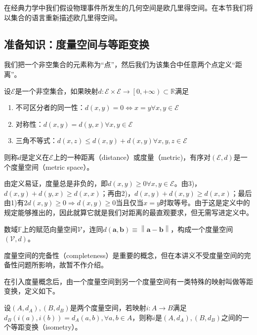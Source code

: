 \documentclass[main.tex]{subfiles}
\begin{document}
在经典力学中我们假设物理事件所发生的几何空间是欧几里得空间。在本节我们将以集合的语言重新描述欧几里得空间。

\subsection{准备知识：度量空间与等距变换}

我们把一个非空集合的元素称为“点”，然后我们为该集合中任意两个点定义“距离”。

\begin{definition}[度量空间]
设$\mathcal{E}$是一个非空集合，如果映射$d:\mathcal{E}\times\mathcal{E}\rightarrow\left[0,+\infty\right)\subset\mathbb{R}$满足
\begin{enumerate}
    \item 不可区分者的同一性：$d\left(x,y\right)=0\Leftrightarrow x=y\forall x,y\in\mathcal{E}$
    \item 对称性：$d\left(x,y\right)=d\left(y,x\right)\forall x,y\in\mathcal{E}$
    \item 三角不等式：$d\left(x,z\right)\leq d\left(x,y\right)+d\left(x,y\right)\forall x,y,z\in\mathcal{E}$
\end{enumerate}
则称$d$是定义在$\mathcal{E}$上的一种距离（distance）或度量（metric)，有序对$\left(\mathcal{E},d\right)$是一个度量空间（metric space）。
\end{definition}

由定义易证，度量总是非负的，即$d\left(x,y\right)\geq0\forall x,y\in\mathcal{E}$。由3)，$d\left(x,y\right)+d\left(y,x\right)\geq d\left(x,x\right)$；再由2)，$d\left(x,y\right)+d\left(x,y\right)\geq d\left(x,x\right)$；最后由1)有$2d\left(x,y\right)\geq0\Rightarrow d\left(x,y\right)\geq0$当且仅当$x=y$时取等号。由于这是定义中的规定能够推出的，因此就算它就是我们对距离的最直观要求，但无需写进定义中。

\begin{example}
数域$\mathbb{F}$上的赋范向量空间$\mathcal{V}$，连同$d\left(\mathbf{a},\mathbf{b}\right)\equiv\left\|\mathbf{a}-\mathbf{b}\right\|$，构成一个度量空间$\left(\mathcal{V},d\right)$。
\end{example}

度量空间的完备性（completeness）是重要的概念，但在本讲义不受度量空间的完备性问题所影响，故暂不作介绍。

在引入度量概念后，由一个度量空间到另一个度量空间有一类特殊的映射叫做等距变换，定义如下。

\begin{definition}[等距变换]
设$\left(A,d_A\right),\left(B,d_B\right)$是两个度量空间，若映射$i:A\rightarrow B$满足$d_B\left(i\left(a\right),i\left(b\right)\right)=d_A\left(a,b\right),\forall a,b\in A$，则称$i$是$\left(A,d_A\right),\left(B,d_B\right)$之间的一个等距变换（isometry）。
\end{definition}
\end{document}
